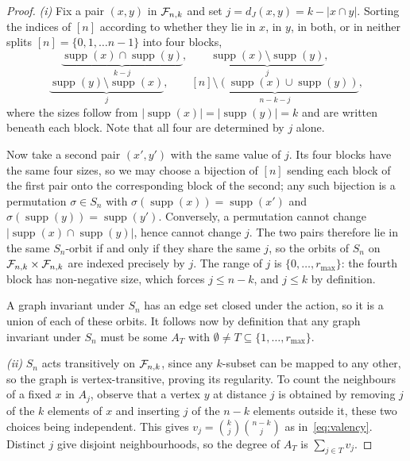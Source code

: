 \begin{proof}

  \emph{(i)}
Fix a pair $(x,y)$ in $\mathcal{F}_{n,k}$ and set $j=d_J(x,y)=k-|x\cap y|$. Sorting the indices
of $[n]$ according to whether they lie in $x$, in $y$, in both, or in
neither splits $[n] = \{0,1,\dots n-1\}$ into four blocks,
\begin{equation*}
  \underbrace{\operatorname{supp}(x)\cap \operatorname{supp}(y)}_{k-j},\qquad
  \underbrace{\operatorname{supp}(x) \setminus \operatorname{supp}(y)}_{j},\qquad
\end{equation*}
\begin{equation*}
  \underbrace{\operatorname{supp}(y) \setminus \operatorname{supp}(x)}_{j},\qquad
  \underbrace{[n]\setminus(\operatorname{supp}(x) \cup \operatorname{supp}(y))}_{n-k-j},
\end{equation*}
where the sizes follow from $|\operatorname{supp}(x)|=|\operatorname{supp}(y)|=k$ and are written beneath each
block. Note that all four are determined by $j$ alone.

Now take a second pair $(x',y')$ with the same value of $j$. Its four
blocks have the same four sizes, so we may choose a bijection of $[n]$
sending each block of the first pair onto the corresponding block of the
second; any such bijection is a permutation $\sigma\in S_n$ with
$\sigma(\operatorname{supp}(x))=\operatorname{supp}(x')$ and $\sigma(\operatorname{supp}(y))=\operatorname{supp}(y')$. Conversely, a permutation cannot change
$|\operatorname{supp}(x) \cap \operatorname{supp}(y)|$, hence cannot change $j$. The two pairs therefore lie in the
same $S_n$-orbit if and only if they share the same $j$, so the orbits of
$S_n$ on $\mathcal{F}_{n,k}\times\mathcal{F}_{n,k}$ are indexed precisely by $j$. The range
of $j$ is $\{0,\dots,r_{\max}\}$: the fourth block has non-negative size,
which forces $j\le n-k$, and $j\le k$ by definition.

A graph invariant under $S_n$ has an edge set closed under the action, so
it is a union of each of these orbits. It follows now by definition that any graph invariant under $S_n$ must be some $A_T$ with $\emptyset\neq T\subseteq\{1,\dots,r_{\max}\}$.

\medskip
\emph{(ii)}
$S_n$ acts transitively on $\mathcal{F}_{n,k}$, since any $k$-subset can be mapped
to any other, so the graph is vertex-transitive, proving its regularity. To count the neighbours of a
fixed $x$ in $A_j$, observe that a vertex $y$ at distance $j$ is obtained
by removing $j$ of the $k$ elements of $x$ and inserting $j$ of the $n-k$
elements outside it, these two choices being independent. This gives
$v_j=\binom{k}{j}\binom{n-k}{j}$ as in~\eqref{eq:valency}. Distinct $j$
give disjoint neighbourhoods, so the degree of $A_T$ is $\sum_{j\in T}v_j$.


\end{proof}
